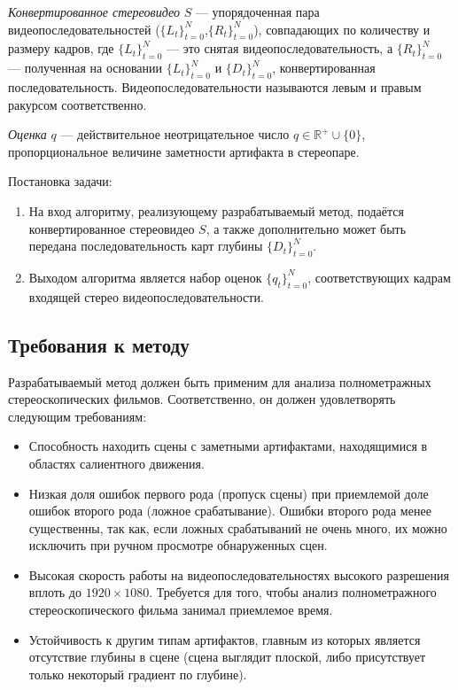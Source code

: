 \documentclass[14pt, a4paper]{extarticle}
\begin{document}
\textit{Конвертированное стереовидео} $S$ --- упорядоченная пара видеопоследовательностей 
($\{L_t\}_{t=0}^N$,$\{R_t\}_{t=0}^N$), совпадающих по количеству и размеру кадров, 
где $\{L_t\}_{t=0}^N$ --- это снятая видеопоследовательность, а $\{R_t\}_{t=0}^N$ --- 
полученная на основании $\{L_t\}_{t=0}^N$ и $\{D_t\}_{t=0}^N$, конвертированная последовательность. 
Видеопоследовательности называются левым и правым ракурсом соответственно.

\textit{Оценка} $q$ --- действительное неотрицательное число $q \in \mathbb{R}^{+} \cup \{0\}$, 
пропорциональное величине заметности артифакта в стереопаре.

Постановка задачи:

\begin{enumerate}
	\item На вход алгоритму, реализующему разрабатываемый метод, 
	подаётся конвертированное стереовидео $S$, а также дополнительно может быть 
	передана последовательность карт глубины $\{D_t\}_{t=0}^N$.
	\item Выходом алгоритма является набор оценок $\{q_t\}_{t=0}^N$, 
	соответствующих кадрам входящей стерео видеопоследовательности.
\end{enumerate}

\subsection{Требования к методу}

Разрабатываемый метод должен быть применим для анализа полнометражных 
стереоскопических фильмов. Соответственно, он должен удовлетворять следующим требованиям:

\begin{itemize}
	\item Способность находить сцены с заметными артифактами, 
	находящимися в областях салиентного движения.
	\item Низкая доля ошибок первого рода (пропуск сцены) при приемлемой доле 
	ошибок второго рода (ложное срабатывание). Ошибки второго рода менее существенны, 
	так как, если ложных срабатываний не очень много, их можно исключить 
	при ручном просмотре обнаруженных сцен.
	\item Высокая скорость работы на видеопоследовательностях высокого разрешения 
	вплоть до $1920 \times 1080$. Требуется для того, чтобы анализ 
	полнометражного стереоскопического фильма занимал приемлемое время.
	\item Устойчивость к другим типам артифактов, главным из которых является отсутствие 
	глубины в сцене (сцена выглядит плоской, либо присутствует только некоторый градиент по глубине).
\end{itemize}
\end{document}
